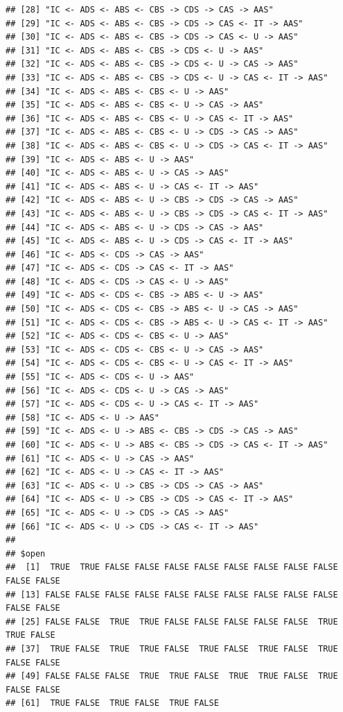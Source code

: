 \documentclass[10pt,dvipsnames,enabledeprecatedfontcommands]{scrartcl}
\begin{document}
\begin{verbatim}
## [28] "IC <- ADS <- ABS <- CBS -> CDS -> CAS -> AAS"           
## [29] "IC <- ADS <- ABS <- CBS -> CDS -> CAS <- IT -> AAS"     
## [30] "IC <- ADS <- ABS <- CBS -> CDS -> CAS <- U -> AAS"      
## [31] "IC <- ADS <- ABS <- CBS -> CDS <- U -> AAS"             
## [32] "IC <- ADS <- ABS <- CBS -> CDS <- U -> CAS -> AAS"      
## [33] "IC <- ADS <- ABS <- CBS -> CDS <- U -> CAS <- IT -> AAS"
## [34] "IC <- ADS <- ABS <- CBS <- U -> AAS"                    
## [35] "IC <- ADS <- ABS <- CBS <- U -> CAS -> AAS"             
## [36] "IC <- ADS <- ABS <- CBS <- U -> CAS <- IT -> AAS"       
## [37] "IC <- ADS <- ABS <- CBS <- U -> CDS -> CAS -> AAS"      
## [38] "IC <- ADS <- ABS <- CBS <- U -> CDS -> CAS <- IT -> AAS"
## [39] "IC <- ADS <- ABS <- U -> AAS"                           
## [40] "IC <- ADS <- ABS <- U -> CAS -> AAS"                    
## [41] "IC <- ADS <- ABS <- U -> CAS <- IT -> AAS"              
## [42] "IC <- ADS <- ABS <- U -> CBS -> CDS -> CAS -> AAS"      
## [43] "IC <- ADS <- ABS <- U -> CBS -> CDS -> CAS <- IT -> AAS"
## [44] "IC <- ADS <- ABS <- U -> CDS -> CAS -> AAS"             
## [45] "IC <- ADS <- ABS <- U -> CDS -> CAS <- IT -> AAS"       
## [46] "IC <- ADS <- CDS -> CAS -> AAS"                         
## [47] "IC <- ADS <- CDS -> CAS <- IT -> AAS"                   
## [48] "IC <- ADS <- CDS -> CAS <- U -> AAS"                    
## [49] "IC <- ADS <- CDS <- CBS -> ABS <- U -> AAS"             
## [50] "IC <- ADS <- CDS <- CBS -> ABS <- U -> CAS -> AAS"      
## [51] "IC <- ADS <- CDS <- CBS -> ABS <- U -> CAS <- IT -> AAS"
## [52] "IC <- ADS <- CDS <- CBS <- U -> AAS"                    
## [53] "IC <- ADS <- CDS <- CBS <- U -> CAS -> AAS"             
## [54] "IC <- ADS <- CDS <- CBS <- U -> CAS <- IT -> AAS"       
## [55] "IC <- ADS <- CDS <- U -> AAS"                           
## [56] "IC <- ADS <- CDS <- U -> CAS -> AAS"                    
## [57] "IC <- ADS <- CDS <- U -> CAS <- IT -> AAS"              
## [58] "IC <- ADS <- U -> AAS"                                  
## [59] "IC <- ADS <- U -> ABS <- CBS -> CDS -> CAS -> AAS"      
## [60] "IC <- ADS <- U -> ABS <- CBS -> CDS -> CAS <- IT -> AAS"
## [61] "IC <- ADS <- U -> CAS -> AAS"                           
## [62] "IC <- ADS <- U -> CAS <- IT -> AAS"                     
## [63] "IC <- ADS <- U -> CBS -> CDS -> CAS -> AAS"             
## [64] "IC <- ADS <- U -> CBS -> CDS -> CAS <- IT -> AAS"       
## [65] "IC <- ADS <- U -> CDS -> CAS -> AAS"                    
## [66] "IC <- ADS <- U -> CDS -> CAS <- IT -> AAS"              
## 
## $open
##  [1]  TRUE  TRUE FALSE FALSE FALSE FALSE FALSE FALSE FALSE FALSE FALSE FALSE
## [13] FALSE FALSE FALSE FALSE FALSE FALSE FALSE FALSE FALSE FALSE FALSE FALSE
## [25] FALSE FALSE  TRUE  TRUE FALSE FALSE FALSE FALSE FALSE  TRUE  TRUE FALSE
## [37]  TRUE FALSE  TRUE  TRUE FALSE  TRUE FALSE  TRUE FALSE  TRUE FALSE FALSE
## [49] FALSE FALSE FALSE  TRUE  TRUE FALSE  TRUE  TRUE FALSE  TRUE FALSE FALSE
## [61]  TRUE FALSE  TRUE FALSE  TRUE FALSE
\end{verbatim}
\end{document}
